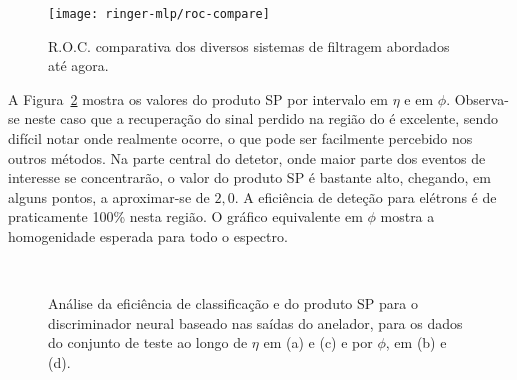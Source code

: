 \begin{figure}
\begin{center}
\texttt{[image: ringer-mlp/roc-compare]}
\end{center}
\caption{R.O.C. comparativa dos diversos sistemas de filtragem abordados até agora.}
\label{fig:ringer-test-roc}
\end{figure}

A Figura~\ref{fig:ringer-eta-phi} mostra os valores do produto SP por
intervalo em $\eta$ e em $\phi$. Observa-se neste caso que a recuperação do
sinal perdido na região do  é excelente, sendo difícil notar onde
realmente ocorre, o que pode ser facilmente percebido nos outros métodos. Na
parte central do detetor, onde maior parte dos eventos de interesse se
concentrarão, o valor do produto SP é bastante alto, chegando, em alguns
pontos, a aproximar-se de $2,0$. A eficiência de deteção para elétrons é de
praticamente 100\% nesta região. O gráfico equivalente em $\phi$ mostra a
homogenidade esperada para todo o espectro.

\begin{figure}
\begin{center}
\mbox{%
}
\mbox{%
}
\end{center}
\caption{Análise da eficiência de classificação e do produto SP para o
discriminador neural baseado nas saídas do anelador, para os dados do conjunto
de teste ao longo de $\eta$ em (a) e (c) e por $\phi$, em (b) e (d).}
\label{fig:ringer-eta-phi}
\end{figure}



